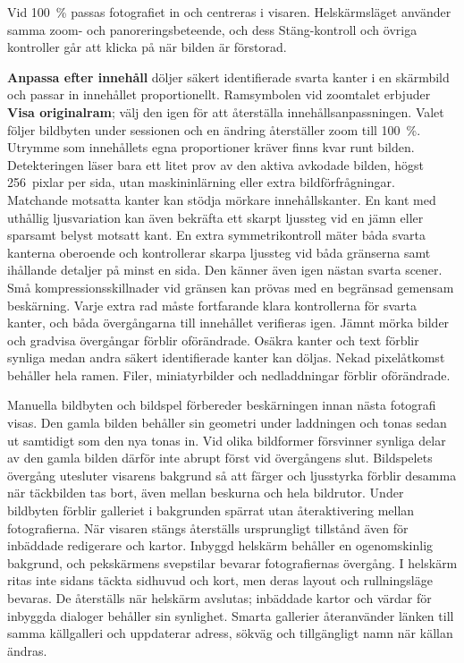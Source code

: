 \documentclass[11pt,a4paper]{article}
\newcommand{\ui}[1]{\textbf{#1}}
\begin{document}
Vid 100~\% passas fotografiet in och centreras i visaren. Helskärmsläget
använder samma zoom- och panoreringsbeteende, och dess Stäng-kontroll och övriga
kontroller går att klicka på när bilden är förstorad.

\ui{Anpassa efter innehåll} döljer säkert identifierade svarta kanter i en
skärmbild och passar in innehållet proportionellt. Ramsymbolen vid zoomtalet
erbjuder \ui{Visa originalram}; välj den igen för att återställa
innehållsanpassningen. Valet följer bildbyten under sessionen och en ändring
återställer zoom till 100~\%. Utrymme som innehållets egna proportioner kräver
finns kvar runt bilden.
Detekteringen läser bara ett litet prov av den aktiva avkodade bilden, högst
256~pixlar per sida, utan maskininlärning eller extra bildförfrågningar.
Matchande motsatta kanter kan stödja mörkare innehållskanter. En kant med
uthållig ljusvariation kan även bekräfta ett skarpt ljussteg vid en jämn eller
sparsamt belyst motsatt kant. En extra symmetrikontroll mäter båda svarta
kanterna oberoende och kontrollerar skarpa ljussteg vid båda gränserna samt
ihållande detaljer på minst en sida. Den känner även igen nästan svarta scener.
Små kompressionsskillnader vid gränsen kan prövas med en begränsad gemensam
beskärning. Varje extra rad måste fortfarande klara kontrollerna för svarta
kanter, och båda övergångarna till innehållet verifieras igen.
Jämnt mörka bilder och gradvisa övergångar
förblir oförändrade. Osäkra
kanter och text förblir synliga medan andra säkert identifierade kanter kan
döljas. Nekad pixelåtkomst behåller hela ramen. Filer, miniatyrbilder och
nedladdningar förblir oförändrade.

Manuella bildbyten och bildspel förbereder beskärningen innan nästa fotografi
visas. Den gamla bilden behåller sin geometri under laddningen och tonas sedan
ut samtidigt som den nya tonas in. Vid olika bildformer försvinner synliga
delar av den gamla bilden därför inte abrupt först vid övergångens slut.
Bildspelets övergång utesluter visarens bakgrund så att färger och ljusstyrka
förblir
desamma när täckbilden tas bort, även mellan beskurna och hela bildrutor.
Under bildbyten förblir galleriet i bakgrunden spärrat utan återaktivering
mellan fotografierna. När visaren stängs återställs ursprungligt tillstånd
även för inbäddade redigerare och kartor. Inbyggd helskärm behåller en
ogenomskinlig
bakgrund, och pekskärmens svepstilar bevarar fotografiernas övergång.
I helskärm ritas inte sidans täckta sidhuvud och kort, men deras layout och
rullningsläge bevaras. De återställs när helskärm avslutas; inbäddade kartor
och värdar för inbyggda dialoger behåller sin synlighet. Smarta gallerier
återanvänder länken till samma källgalleri och uppdaterar adress, sökväg och
tillgängligt namn när källan ändras.
\end{document}
